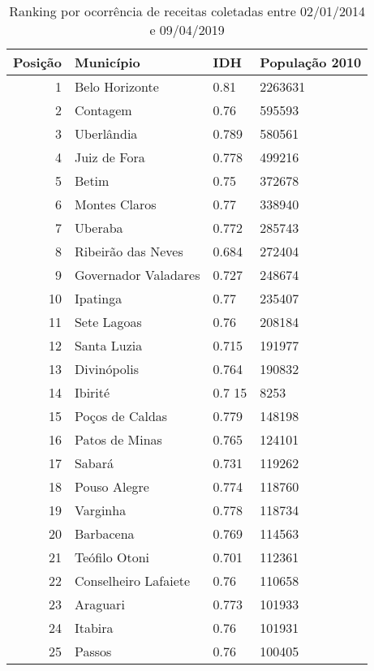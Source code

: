 \begin{table}[H]
	\centering
	\caption{Ranking por ocorrência de receitas coletadas entre 02/01/2014 e 09/04/2019}
	\vspace{0.5cm}
	\begin{tabular}{r|l|l|l}
		    
		Posição & Município       & IDH    & População 2010 \\ %
		\hline                               %
		1	 &  Belo Horizonte  & 0.81 	 &  2263631 	\\
		2	 &  Contagem    & 0.76 	 &  595593 	\\
		3	 &  Uberlândia  & 0.789	 &  580561 	\\
		4	 &  Juiz de Fora    & 0.778	 &  499216 	\\
		5	 &  Betim   & 0.75 	 &  372678 	\\
		6	 &  Montes Claros   & 0.77 	 &  338940 	\\
		7	 &  Uberaba & 0.772	 &  285743 \\
		8	 &  Ribeirão das Neves  & 0.684	 &  272404 	\\
		9	 &  Governador Valadares    & 0.727	 &  248674 	\\
		10	 &  Ipatinga    & 0.77 	 &  235407 	\\
		11	 &  Sete Lagoas & 0.76 	 &  208184 \\
		12	 &  Santa Luzia & 0.715	 &  191977 \\
		13	 &  Divinópolis & 0.764	 &  190832 \\
		14	 &  Ibirité & 0.7 15&8253 \\
		15	 &  Poços de Caldas & 0.779	 &  148198 \\
		16	 &  Patos de Minas  & 0.765	 &  124101 	\\
		17	 &  Sabará  & 0.731	 &  119262 	\\
		18	 &  Pouso Alegre    & 0.774	 &  118760 	\\
		19	 &  Varginha    & 0.778	 &  118734 	\\
		20	 &  Barbacena   & 0.769	 &  114563 	\\
		21	 &  Teófilo Otoni   & 0.701	 &  112361 	\\
		22	 &  Conselheiro Lafaiete    & 0.76 	 &  110658 	\\
		23	 &  Araguari    & 0.773	 &  101933 	\\
		24	 &  Itabira & 0.76 	 &  101931 \\
		25	 &  Passos  & 0.76 	 &  100405 	\\

\end{tabular}
\end{table}
